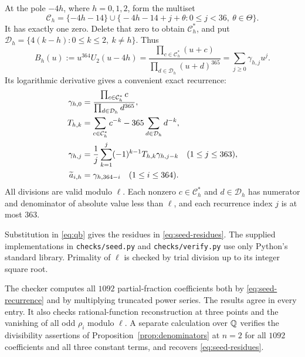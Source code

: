 At the pole $-4h$, where $h=0,1,2$, form the multiset
\[
 \mathcal C_h=\{-4h-14\}\mathbin{\cup}
 \{\!-4h-14+j+\theta:0\leq j<36,\ \theta\in\Theta\}.
\]
It has exactly one zero. Delete that zero to obtain $\mathcal C_h^*$,
and put $\mathcal D_h=\{4(k-h):0\leq k\leq2,\ k\ne h\}$.
Thus
\[
 B_h(u):=u^{364}U_2(u-4h)
       =\frac{\prod_{c\in\mathcal C_h^*}(u+c)}
                    {\prod_{d\in\mathcal D_h}(u+d)^{365}}
       =\sum_{j\geq0}\gamma_{h,j}u^j.
\]
Its logarithmic derivative gives a convenient exact recurrence:
\begin{align}
 \gamma_{h,0}&=\frac{\prod_{c\in\mathcal C_h^*}c}
                         {\prod_{d\in\mathcal D_h}d^{365}},\notag\\
 T_{h,k}&=\sum_{c\in\mathcal C_h^*}c^{-k}
                      -365\sum_{d\in\mathcal D_h}d^{-k},\notag\\
 \gamma_{h,j}&=\frac1j\sum_{k=1}^{j}(-1)^{k-1}T_{h,k}\gamma_{h,j-k}
                 \quad(1\leq j\leq363),\label{eq:seed-recurrence}\\
 \widetilde a_{i,h}&=\gamma_{h,364-i}\quad(1\leq i\leq364).
 \notag
\end{align}
All divisions are valid modulo $\ell$. Each nonzero
$c\in\mathcal C_h^*$ and $d\in\mathcal D_h$ has numerator and denominator
of absolute value less than $\ell$, and each recurrence index $j$ is
at most $363$.

Substitution in \eqref{eq:qb} gives the residues in
\eqref{eq:seed-residues}. The supplied implementations in
\texttt{checks/seed.py} and \texttt{checks/verify.py} use only Python's
standard library. Primality of $\ell$ is checked by trial division up to
its integer square root.

The checker computes all $1092$ partial-fraction coefficients both by
\eqref{eq:seed-recurrence} and by multiplying truncated power series.
The results agree in every entry. It also checks rational-function
reconstruction at three points and the vanishing of all odd $\rho_i$
modulo $\ell$. A separate calculation over $\mathbb Q$ verifies the
divisibility assertions of Proposition~\ref{prop:denominators} at
$n=2$ for all $1092$ coefficients and all three constant terms, and
recovers \eqref{eq:seed-residues}.

